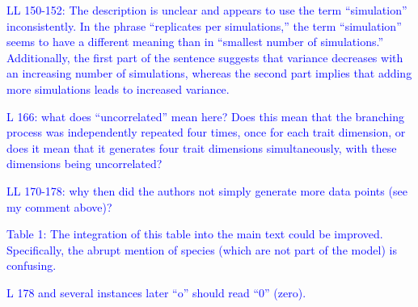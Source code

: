 \documentclass[
]{article}
\begin{document}
\textcolor{blue}{LL 150-152: The description is unclear and appears to use the term ``simulation'' inconsistently.
In the phrase ``replicates per simulations,'' the term ``simulation'' seems to have a different meaning than in ``smallest number of simulations.'' Additionally, the first part of the sentence suggests that variance decreases with an increasing number of simulations, whereas the second part implies that adding more simulations leads to increased variance.}

\textcolor{blue}{L 166: what does ``uncorrelated'' mean here? Does this mean that the branching process was independently repeated four times, once for each trait dimension, or does it mean that it generates four trait dimensions simultaneously, with these dimensions being uncorrelated?}

\textcolor{blue}{LL 170-178: why then did the authors not simply generate more data points (see my comment above)?}

\textcolor{blue}{Table 1: The integration of this table into the main text could be improved.
Specifically, the abrupt mention of species (which are not part of the model) is confusing.}

\textcolor{blue}{L 178 and several instances later ``o'' should read ``0'' (zero).}
\end{document}
